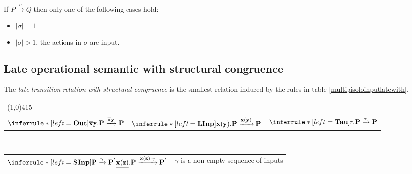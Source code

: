 \begin{lemma}\label{lemmastrongsequence}
  If $P\xrightarrow{\sigma} Q$ then only one of the following cases hold: 
  \begin{itemize}
    \item 
      $|\sigma|=1$
    \item
      $|\sigma|>1$, the actions in $\sigma$ are input.
  \end{itemize}
\end{lemma}



\subsection{Late operational semantic with structural congruence}

\begin{definition}
  The \emph{late transition relation with structural congruence} is the smallest relation induced by the rules in table \ref{multipisoloinputlatewith}.
  \begin{table}
    \begin{tabular}{lll}
	\multicolumn{3}{l}{\line(1,0){415}}
	\\\\
	  $\inferrule* [left=\bf{Out}]{
	  }{
	    \overline{x}y.P \xrightarrow{\overline{x}y} P
	  }$
	&
	  $\inferrule* [left=\bf{LInp}]{
	  }{
	    x(y).P \xrightarrow{x(y)} P
	  }$
	&
	  $\inferrule* [left=\bf{Tau}]{
	  }{
	    \tau.P \xrightarrow{\tau} P
	  }$
      \\
      \end{tabular}
	\\
      \begin{tabular}{ll}
      \\
	  $\inferrule* [left=\bf{SInp}]{
	      P \xrightarrow{\gamma} P^{'}
	  }{
	    \underline{x(z)}.P \xrightarrow{x(z) \cdot \gamma} P^{'}
	  }$
	&
	  $\gamma$ is a non empty sequence of inputs
      \\
      \end{tabular}
	\\
\end{table}
\end{definition}
